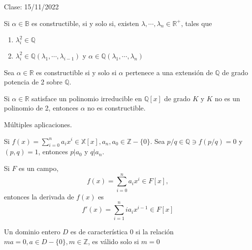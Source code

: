 Clase: 15/11/2022

\begin{teorema}
    Si $\alpha\in\mathbb{B}$ es constructible, si y solo si, existen $\lambda, \cdots,\lambda_n\in \mathbb{R}^+$, tales que 
    \begin{enumerate}
        \item $\lambda_i^2\in \mathbb{Q}$
        \item $\lambda_i^2\in \mathbb{Q}(\lambda_1,\cdots, \lambda_{i-1})$ y $\alpha\in \mathbb{Q}(\lambda_1,\cdots,\lambda_n)$
    \end{enumerate}
    \begin{dem}
        
    \end{dem}
\end{teorema}

\begin{corolario}
    Sea $\alpha\in\mathbb{R}$ es constructible si y solo si $\alpha$ pertenece a una extensión de $\mathbb{Q}$ de grado potencia de 2 sobre $\mathbb{Q}$. 
\end{corolario}

\begin{corolario}
    Si $\alpha\in \mathbb{R}$ satisface un polinomio irreducible en $\mathbb{Q}[x]$ de grado $K$ y $K$ no es un polinomio de 2, entonces $\alpha$ no es constructible. 
\end{corolario}

\begin{ejemplo}
    Múltiples aplicaciones.
\end{ejemplo}

\begin{teorema}
    Si $f(x)=\sum_{i=0}^n a_ix^i \in \mathbb{X}[x],a_n,a_0\in \mathbb{Z}-\{0\}$. Sea $p/q\in \mathbb{Q}\ni f(p/q)=0$ y $(p,q)=1$, entonces $p|a_0$ y $q|a_n$.
    \begin{dem}
        
    \end{dem}
\end{teorema}

\begin{definicion}
    Si $F$ es un campo,
    $$f(x)=\sum_{i=0}^n a_i x^i \in F[x],$$
    entonces la derivada de $f(x)$ es 
    $$f'(x)=\sum_{i=1}^n ia_i x^{i-1}\in F[x]$$
\end{definicion}

\begin{definicion}
    Un dominio entero $D$ es de característica 0 si la relación $ma=0,a\in D-\{0\},m\in \mathbb{Z}$, es válido solo si $m=0$
\end{definicion}


